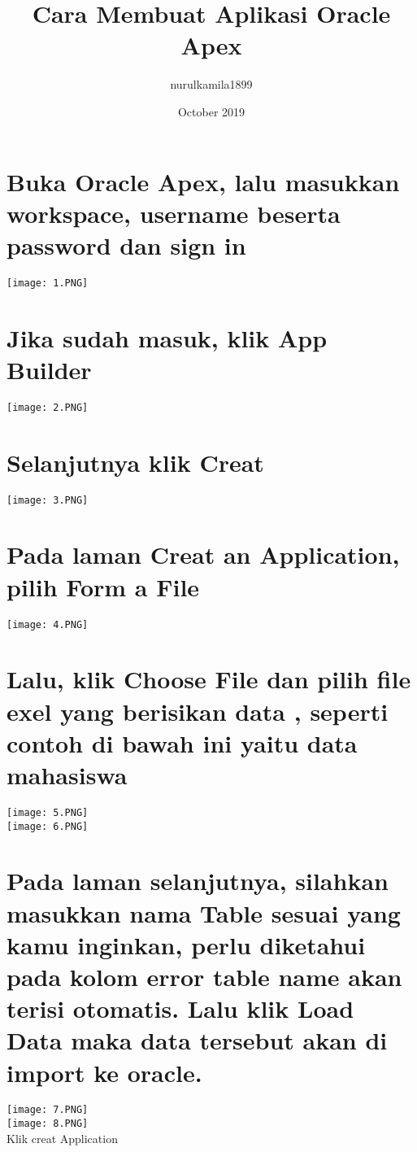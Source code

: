 \documentclass{article}
\title{Cara Membuat Aplikasi Oracle Apex}
\author{nurulkamila1899 }
\date{October 2019}
\begin{document}
\maketitle

\section{Buka Oracle Apex, lalu masukkan workspace, username beserta password dan sign in}
\begin{center}
    \texttt{[image: 1.PNG]}
\end{center}
\section{Jika sudah masuk, klik App Builder}
\begin{center}
    \texttt{[image: 2.PNG]}
\end{center}
\section{Selanjutnya klik Creat}
\begin{center}
    \texttt{[image: 3.PNG]}
\end{center}
\section{Pada laman Creat an Application, pilih Form a File}
\begin{center}
    \texttt{[image: 4.PNG]}
\end{center}
\section{Lalu, klik Choose File dan pilih file exel yang berisikan data , seperti contoh di bawah ini yaitu data mahasiswa}
\begin{center}
    \texttt{[image: 5.PNG]} \\
    \texttt{[image: 6.PNG]}
\end{center}
\section{Pada laman selanjutnya, silahkan masukkan nama Table sesuai yang kamu inginkan, perlu diketahui pada kolom error table name akan terisi otomatis. Lalu klik Load Data maka data tersebut akan di import ke oracle.}
\begin{center}
    \texttt{[image: 7.PNG]} \\
    \texttt{[image: 8.PNG]}\\
    Klik creat Application
\end{center}
\end{document}
